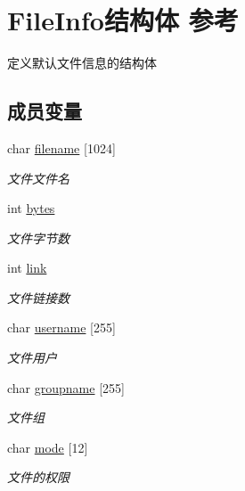 \hypertarget{struct_file_info}{\section{File\-Info结构体 参考}
\label{struct_file_info}
}


定义默认文件信息的结构体  


\subsection*{成员变量}
\begin{DoxyCompactItemize}
\item 
char \hyperlink{struct_file_info_a5482b27881397d5b87f54feab7471580}{filename} \mbox{[}1024\mbox{]}
\begin{DoxyCompactList}\small\item\em 文件文件名 \end{DoxyCompactList}\item 
int \hyperlink{struct_file_info_a3e18e5ab1201e205ce88c473a2f4bf99}{bytes}
\begin{DoxyCompactList}\small\item\em 文件字节数 \end{DoxyCompactList}\item 
int \hyperlink{struct_file_info_af203a1810ce3b44e2b2219c63e0ceff9}{link}
\begin{DoxyCompactList}\small\item\em 文件链接数 \end{DoxyCompactList}\item 
char \hyperlink{struct_file_info_aca24a0305b4170dd5a1b4bfd10dd898a}{username} \mbox{[}255\mbox{]}
\begin{DoxyCompactList}\small\item\em 文件用户 \end{DoxyCompactList}\item 
char \hyperlink{struct_file_info_a9f6545b7fd455eaac34ee2bc61d2a172}{groupname} \mbox{[}255\mbox{]}
\begin{DoxyCompactList}\small\item\em 文件组 \end{DoxyCompactList}\item 
char \hyperlink{struct_file_info_a4a90d35594fe528385e0f34e9412dfbb}{mode} \mbox{[}12\mbox{]}
\begin{DoxyCompactList}\small\item\em 文件的权限 \end{DoxyCompactList}\item 

\end{DoxyCompactItemize}
